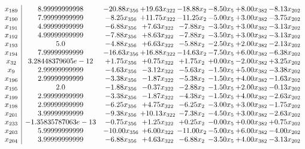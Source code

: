 \documentclass[8pt]{article}
\begin{document}
\[\begin{array}{c| c c@{\hskip 2pt} c@{\hskip 2pt} c@{\hskip 2pt} c@{\hskip 2pt} c@{\hskip 2pt} c@{\hskip 2pt} }
 x_{189}   &  8.99999999998 & -20.88 x_{356} & + 19.63 x_{322} & -18.88 x_{2} & -8.50 x_{5} & +  8.00 x_{382} & -8.13 x_{202}\\
 x_{190}   &  7.99999999999 & -8.25 x_{356} & + 11.75 x_{322} & -11.25 x_{2} & -5.00 x_{5} & +  3.00 x_{382} & -3.75 x_{202}\\
 x_{191}   &  4.99999999999 & -6.88 x_{356} & +  7.63 x_{322} & -7.88 x_{2} & -3.50 x_{5} & +  3.00 x_{382} & -3.13 x_{202}\\
 x_{192}   &  4.99999999999 & -7.88 x_{356} & +  8.63 x_{322} & -7.88 x_{2} & -3.50 x_{5} & +  3.00 x_{382} & -3.13 x_{202}\\
 x_{193}   &  5.0 & -4.88 x_{356} & +  6.63 x_{322} & -5.88 x_{2} & -2.50 x_{5} & +  2.00 x_{382} & -2.13 x_{202}\\
 x_{194}   &  7.99999999999 & -16.63 x_{356} & + 16.88 x_{322} & -14.63 x_{2} & -7.50 x_{5} & +  6.00 x_{382} & -6.38 x_{202}\\
 x_{32}   &  3.28448379605e-12 & +  1.75 x_{356} & +  0.75 x_{322} & +  1.75 x_{2} & +  0.00 x_{5} & -2.00 x_{382} & +  3.25 x_{202}\\
 x_{9}   &  2.99999999999 & -4.63 x_{356} & -3.12 x_{322} & -5.63 x_{2} & -1.50 x_{5} & +  5.00 x_{382} & -3.38 x_{202}\\
 x_{196}   &  2.99999999999 & -3.38 x_{356} & -1.87 x_{322} & -5.38 x_{2} & -1.50 x_{5} & +  4.00 x_{382} & -1.63 x_{202}\\
 x_{195}   &  2.0 & -1.88 x_{356} & -0.37 x_{322} & -2.88 x_{2} & -1.50 x_{5} & +  2.00 x_{382} & -0.13 x_{202}\\
 x_{199}   &  2.99999999999 & -3.38 x_{356} & -1.87 x_{322} & -4.38 x_{2} & -1.50 x_{5} & +  4.00 x_{382} & -2.63 x_{202}\\
 x_{198}   &  2.99999999999 & -6.25 x_{356} & +  4.75 x_{322} & -6.25 x_{2} & -3.00 x_{5} & +  3.00 x_{382} & -1.75 x_{202}\\
 x_{201}   &  3.99999999999 & -9.38 x_{356} & + 10.13 x_{322} & -7.38 x_{2} & -4.50 x_{5} & +  3.00 x_{382} & -2.63 x_{202}\\
 x_{233}   &  -1.35835787063e-13 & -0.75 x_{356} & +  1.25 x_{322} & +  0.25 x_{2} & -0.00 x_{5} & +  0.00 x_{382} & +  0.75 x_{202}\\
 x_{203}   &  5.99999999999 & -10.00 x_{356} & +  6.00 x_{322} & -11.00 x_{2} & -5.00 x_{5} & +  6.00 x_{382} & -4.00 x_{202}\\
 x_{204}   &  3.99999999999 & -6.88 x_{356} & +  4.63 x_{322} & -6.88 x_{2} & -3.50 x_{5} & +  4.00 x_{382} & -3.13 x_{202}\\

\end{array}\]
\end{document}
